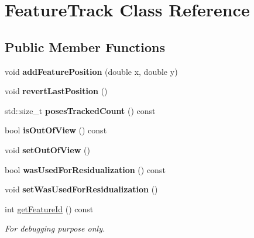 \hypertarget{class_feature_track}{\section{Feature\-Track Class Reference}
\label{class_feature_track}
}
\subsection*{Public Member Functions}
\begin{DoxyCompactItemize}
\item 
\hypertarget{class_feature_track_a5f13b226ac16fb0c9abe692c17f0f0c6}{void {\bfseries add\-Feature\-Position} (double x, double y)}\label{class_feature_track_a5f13b226ac16fb0c9abe692c17f0f0c6}

\item 
\hypertarget{class_feature_track_aa21cd2b1af1f2aaea1e7d19631f80474}{void {\bfseries revert\-Last\-Position} ()}\label{class_feature_track_aa21cd2b1af1f2aaea1e7d19631f80474}

\item 
\hypertarget{class_feature_track_aa37fc3152eb3320a1161bdc638da2e09}{std\-::size\-\_\-t {\bfseries poses\-Tracked\-Count} () const }\label{class_feature_track_aa37fc3152eb3320a1161bdc638da2e09}

\item 
\hypertarget{class_feature_track_a966f8f018b7305d764216880f4a6f8ba}{bool {\bfseries is\-Out\-Of\-View} () const }\label{class_feature_track_a966f8f018b7305d764216880f4a6f8ba}

\item 
\hypertarget{class_feature_track_a75a507f6ac11d3a9319523d131c7949d}{void {\bfseries set\-Out\-Of\-View} ()}\label{class_feature_track_a75a507f6ac11d3a9319523d131c7949d}

\item 
\hypertarget{class_feature_track_abd64cf7785392e852bb93409fd063917}{bool {\bfseries was\-Used\-For\-Residualization} () const }\label{class_feature_track_abd64cf7785392e852bb93409fd063917}

\item 
\hypertarget{class_feature_track_a6317ed29fff383fc365d64d6c5ce1aa2}{void {\bfseries set\-Was\-Used\-For\-Residualization} ()}\label{class_feature_track_a6317ed29fff383fc365d64d6c5ce1aa2}

\item 
int \hyperlink{class_feature_track_aeba4f7f42fe7c065a17bd26e2817dcbe}{get\-Feature\-Id} () const 
\begin{DoxyCompactList}\small\item\em For debugging purpose only. \end{DoxyCompactList}\end{DoxyCompactItemize}



